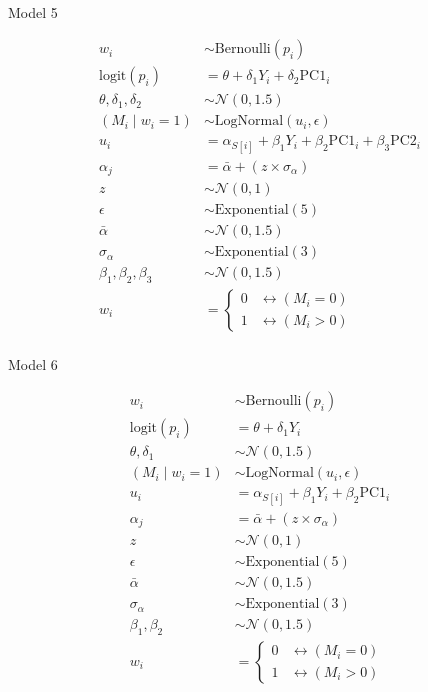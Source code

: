 \documentclass[
  letterpaper,
  DIV=11,
  numbers=noendperiod]{scrartcl}
\makeatletter
\let\oldparagraph\paragraph
\renewcommand{\paragraph}{
    \@ifstar
      \xxxParagraphStar
      \xxxParagraphNoStar
  }
\newcommand{\xxxParagraphStar}[1]{\oldparagraph*{#1}\mbox{}}
\newcommand{\xxxParagraphNoStar}[1]{\oldparagraph{#1}\mbox{}}
\makeatother
\begin{document}
\paragraph{Model 5}\label{model-5}

\[
\begin{aligned}
w_i &\sim \mathrm{Bernoulli}(p_i) \\
\text{logit}(p_i) &= \theta + \delta_1 Y_i + \delta_2 \mathrm{PC1}_i \\
\theta, \delta_1, \delta_2 &\sim \mathcal{N}(0, 1.5) \\
(M_i \mid w_i = 1) &\sim \mathrm{LogNormal}(u_i, \epsilon) \\
u_i &= \alpha_{S[i]} + \beta_1 Y_i + \beta_2 \mathrm{PC1}_i + \beta_3 \mathrm{PC2}_i \\
\alpha_j &= \bar{\alpha} + (z \times \sigma_\alpha) \\
z &\sim \mathcal{N}(0, 1) \\
\epsilon &\sim \mathrm{Exponential}(5) \\
\bar{\alpha} &\sim \mathcal{N}(0, 1.5) \\
\sigma_\alpha &\sim \mathrm{Exponential}(3) \\
\beta_1, \beta_2, \beta_3 &\sim \mathcal{N}(0, 1.5) \\
w_i &=
\begin{cases}
0 & \leftrightarrow (M_i = 0) \\
1 & \leftrightarrow (M_i > 0)
\end{cases}
\end{aligned}
\]

\paragraph{Model 6}\label{model-6}

\[
\begin{aligned}
w_i &\sim \mathrm{Bernoulli}(p_i) \\
\text{logit}(p_i) &= \theta + \delta_1 Y_i \\
\theta, \delta_1 &\sim \mathcal{N}(0, 1.5) \\
(M_i \mid w_i = 1) &\sim \mathrm{LogNormal}(u_i, \epsilon) \\
u_i &= \alpha_{S[i]} + \beta_1 Y_i + \beta_2 \mathrm{PC1}_i \\
\alpha_j &= \bar{\alpha} + (z \times \sigma_\alpha) \\
z &\sim \mathcal{N}(0, 1) \\
\epsilon &\sim \mathrm{Exponential}(5) \\
\bar{\alpha} &\sim \mathcal{N}(0, 1.5) \\
\sigma_\alpha &\sim \mathrm{Exponential}(3) \\
\beta_1, \beta_2 &\sim \mathcal{N}(0, 1.5) \\
w_i &=
\begin{cases}
0 & \leftrightarrow (M_i = 0) \\
1 & \leftrightarrow (M_i > 0)
\end{cases}
\end{aligned}
\]
\end{document}
